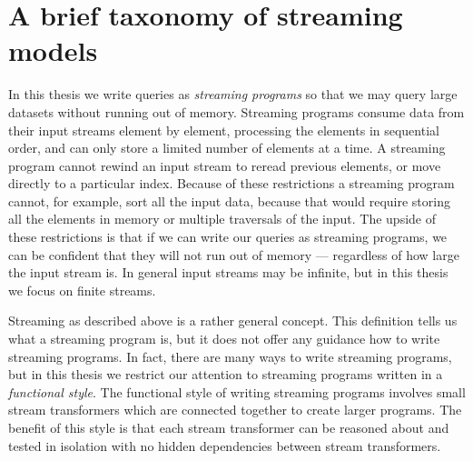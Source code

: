 \chapter{A brief taxonomy of streaming models}
\label{taxonomy}

In this thesis we write queries as \emph{streaming programs} so that we may query large datasets without running out of memory.
Streaming programs consume data from their input streams element by element, processing the elements in sequential order, and can only store a limited number of elements at a time.
A streaming program cannot rewind an input stream to reread previous elements, or move directly to a particular index.
Because of these restrictions a streaming program cannot, for example, sort all the input data, because that would require storing all the elements in memory or multiple traversals of the input.
The upside of these restrictions is that if we can write our queries as streaming programs, we can be confident that they will not run out of memory --- regardless of how large the input stream is.
In general input streams may be infinite, but in this thesis we focus on finite streams.


Streaming as described above is a rather general concept.
This definition tells us what a streaming program is, but it does not offer any guidance how to write streaming programs.
In fact, there are many ways to write streaming programs, but in this thesis we restrict our attention to streaming programs written in a \emph{functional style}.
The functional style of writing streaming programs involves small stream transformers which are connected together to create larger programs.
The benefit of this style is that each stream transformer can be reasoned about and tested in isolation with no hidden dependencies between stream transformers.

